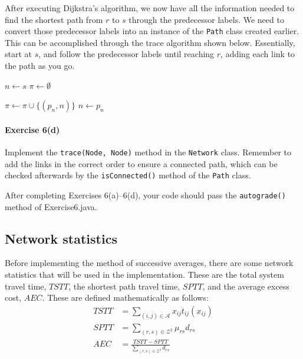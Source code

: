 \documentclass[11pt]{article}
\newcommand{\A}{\mathcal{A}}
\newcommand{\Z}{\mathcal{Z}}
\begin{document}
\vspace{\baselineskip}

\noindent
After executing Dijkstra's algorithm, we now have all the information needed to find the shortest path from $r$ to $s$ through the predecessor labels. We need to convert those predecessor labels into an instance of the \texttt{Path} class created earlier. This can be accomplished through the trace algorithm shown below. Essentially, start at $s$, and follow the predecessor labels until reaching $r$, adding each link to the path as you go. 

\vspace{\baselineskip}

\begin{algorithmic}[1]
	\State $n\leftarrow s$
	\State $\pi \leftarrow \emptyset$
	
	\vspace{0.5\baselineskip}
	
	\State $\pi\leftarrow \pi \cup \{(p_n,n)\}$
	\State $n\leftarrow p_n$
	\EndWhile
	\EndProcedure
\end{algorithmic}


\paragraph*{Exercise 6(d)} Implement the \texttt{trace(Node, Node)} method in the \texttt{Network} class. 
Remember to add the links in the correct order to ensure a connected path, which can be checked afterwards by the \texttt{isConnected()} method of the \texttt{Path} class.

 \vspace{\baselineskip}


\noindent
After completing Exercises 6(a)--6(d), your code should pass the \texttt{autograde()} method of Exercise6.java. 


\subsection{Network statistics}

Before implementing the method of successive averages, there are some network statistics that will be used in the implementation. These are the total system travel time, $TSTT$, the shortest path travel time, $SPTT$, and the average excess cost, $AEC$. These are defined mathematically as follows:
\begin{align}
	TSTT &= \sum\limits_{(i,j)\in\A} x_{ij} t_{ij}(x_{ij})\\
	SPTT &= \sum\limits_{(r,s)\in\Z^2} \mu_{rs} d_{rs}\\
	AEC &= \frac{TSTT- SPTT}{\sum\limits_{(r,s)\in\Z^2} d_{rs}}
\end{align}
\end{document}
